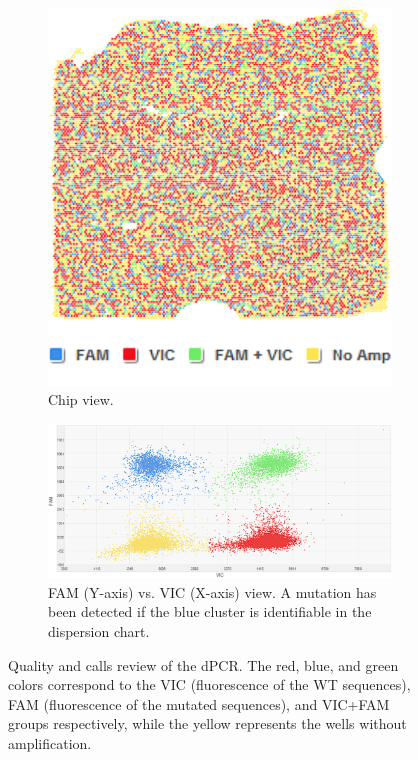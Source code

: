 \begin{enumerate}[font=\bfseries]
    \begin{figure}[t]
        \centering
        \begin{subfigure}{0.30\textwidth}
            \centering
            \includegraphics[width=\textwidth]{Images/chapter_3/FAM_VIC_chip.png}
            \caption{Chip view.}
            \label{fig:FAM_VIC_chip}
        \end{subfigure}
        \hfill
        \begin{subfigure}{0.69\textwidth}
            \centering
            \includegraphics[width=\textwidth]{Images/chapter_3/FAM_VIC.png}
            \caption{FAM\texttrademark{} (Y-axis) vs. VIC\texttrademark{} (X-axis) view. A mutation has been detected if the blue cluster is identifiable in the dispersion chart.}
            \label{fig:FAM_VIC_dispersion}
        \end{subfigure}
        \hfill
        \caption{Quality and calls review of the dPCR. The red, blue, and green colors correspond to the VIC\texttrademark{} (fluorescence of the WT sequences), FAM\texttrademark{} (fluorescence of the mutated sequences), and VIC\texttrademark{}+FAM\texttrademark{} groups respectively, while the yellow represents the wells without amplification.}
        \label{fig:FAM_VIC}
    \end{figure}
\end{enumerate}